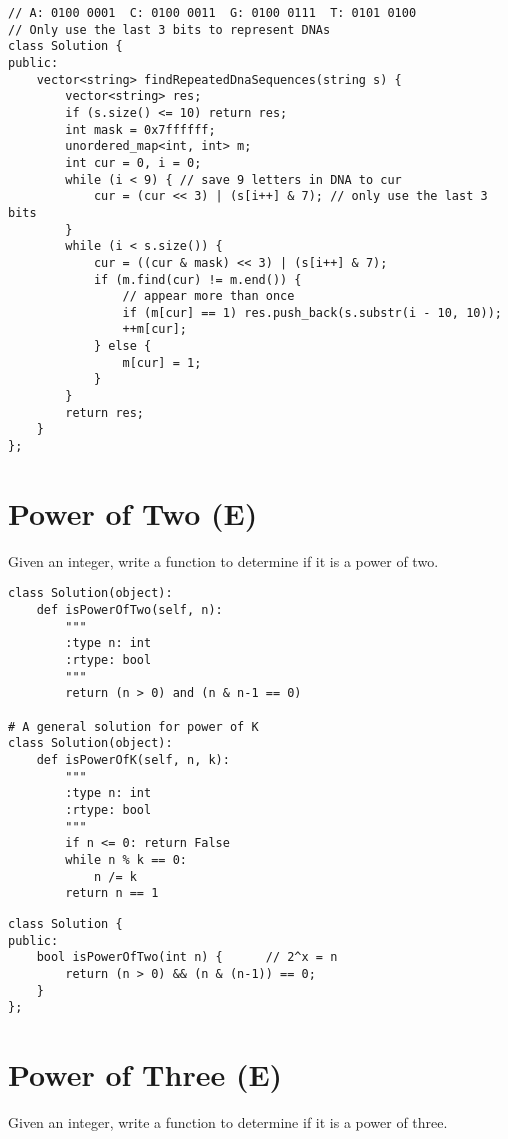 \begin{lstlisting}
// A: 0100 0001  C: 0100 0011  G: 0100 0111  T: 0101 0100
// Only use the last 3 bits to represent DNAs 
class Solution {
public:
    vector<string> findRepeatedDnaSequences(string s) {
        vector<string> res;
        if (s.size() <= 10) return res;
        int mask = 0x7ffffff;
        unordered_map<int, int> m;
        int cur = 0, i = 0;
        while (i < 9) { // save 9 letters in DNA to cur
            cur = (cur << 3) | (s[i++] & 7); // only use the last 3 bits
        }
        while (i < s.size()) {
            cur = ((cur & mask) << 3) | (s[i++] & 7);
            if (m.find(cur) != m.end()) {
                // appear more than once
                if (m[cur] == 1) res.push_back(s.substr(i - 10, 10));
                ++m[cur]; 
            } else {
                m[cur] = 1;
            }
        }
        return res;
    }
};
\end{lstlisting}


\section{Power of Two (E)}
Given an integer, write a function to determine if it is a power of two. \\
 
\begin{lstlisting}
class Solution(object):
    def isPowerOfTwo(self, n):
        """
        :type n: int
        :rtype: bool
        """
        return (n > 0) and (n & n-1 == 0)
    
# A general solution for power of K
class Solution(object):
    def isPowerOfK(self, n, k):
        """
        :type n: int
        :rtype: bool
        """
        if n <= 0: return False
        while n % k == 0:
            n /= k
        return n == 1
\end{lstlisting}
 
\begin{lstlisting}
class Solution {
public:
    bool isPowerOfTwo(int n) {      // 2^x = n
        return (n > 0) && (n & (n-1)) == 0;
    }
};
\end{lstlisting}


\section{Power of Three (E)}
Given an integer, write a function to determine if it is a power of three. \\
 

